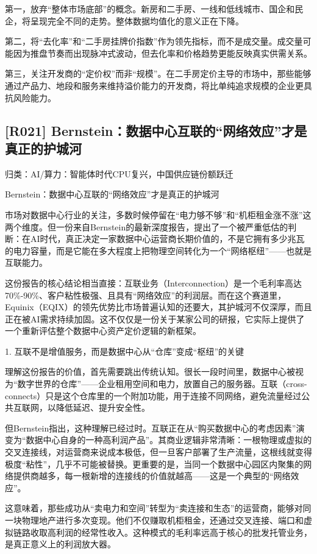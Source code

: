 \documentclass[11pt]{ctexart}
\begin{document}
第一，放弃“整体市场底部”的概念。新房和二手房、一线和低线城市、国企和民企，将呈现完全不同的走势。整体数据均值化的意义正在下降。

第二，将“去化率”和“二手房挂牌价指数”作为领先指标，而不是成交量。成交量可能因为推盘节奏而出现脉冲式波动，但去化率和价格趋势更能反映真实供需关系。

第三，关注开发商的“定价权”而非“规模”。在二手房定价主导的市场中，那些能够通过产品力、地段和服务来维持溢价能力的开发商，将比单纯追求规模的企业更具抗风险能力。

\subsection{[R021] Bernstein：数据中心互联的“网络效应”才是真正的护城河}
{\small\color{refgray}归类：AI/算力：智能体时代CPU复兴，中国供应链份额跃迁}

Bernstein：数据中心互联的“网络效应”才是真正的护城河

市场对数据中心行业的关注，多数时候停留在“电力够不够”和“机柜租金涨不涨”这两个维度。但一份来自Bernstein的最新深度报告，提出了一个被严重低估的判断：在AI时代，真正决定一家数据中心运营商长期价值的，不是它拥有多少兆瓦的电力容量，而是它能在多大程度上把物理空间转化为一个“网络枢纽”——也就是互联能力。

这份报告的核心结论相当直接：互联业务（Interconnection）是一个毛利率高达70\%-90\%、客户粘性极强、且具有“网络效应”的利润层。而在这个赛道里，Equinix（EQIX）的领先优势比市场普遍认知的还要大，其护城河不仅深厚，而且正在被AI需求持续加固。这不仅仅是一份关于某家公司的研报，它实际上提供了一个重新评估整个数据中心资产定价逻辑的新框架。

1. 互联不是增值服务，而是数据中心从“仓库”变成“枢纽”的关键

理解这份报告的价值，首先需要跳出传统认知。很长一段时间里，数据中心被视为“数字世界的仓库”——企业租用空间和电力，放置自己的服务器。互联（cross-connects）只是这个仓库里的一个附加功能，用于连接不同网络，避免流量经过公共互联网，以降低延迟、提升安全性。

但Bernstein指出，这种理解已经过时。互联正在从“购买数据中心的考虑因素”演变为“数据中心自身的一种高利润产品”。其商业逻辑非常清晰：一根物理或虚拟的交叉连接线，对运营商来说成本极低，但一旦客户部署了生产流量，这根线就变得极度“粘性”，几乎不可能被替换。更重要的是，当同一个数据中心园区内聚集的网络提供商越多，每一根新增的连接线的价值就越高——这是一个典型的“网络效应”。

这意味着，那些成功从“卖电力和空间”转型为“卖连接和生态”的运营商，能够对同一块物理地产进行多次变现。他们不仅赚取机柜租金，还通过交叉连接、端口和虚拟链路收取高利润的经常性收入。这种模式的毛利率远高于核心的批发托管业务，是真正意义上的利润放大器。
\end{document}
